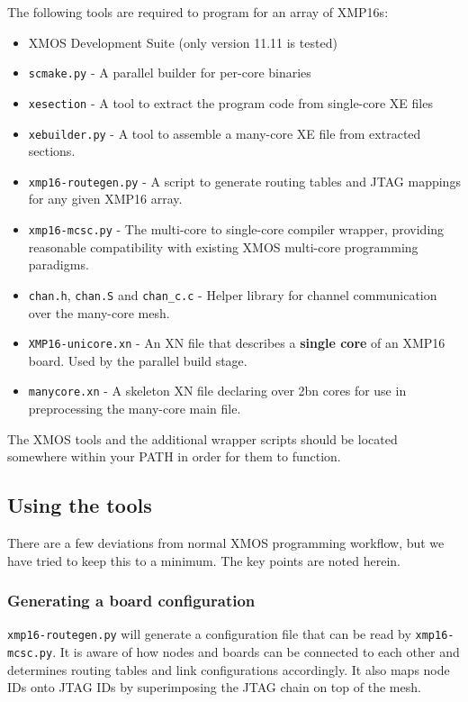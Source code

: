 \documentclass[12pt,a4paper,final,twoside]{article}
\begin{document}
The following tools are required to program for an array of XMP16s:

\begin{itemize}
\item XMOS Development Suite (only version 11.11 is tested)
\item \texttt{scmake.py} - A parallel builder for per-core binaries
\item \texttt{xesection} - A tool to extract the program code from single-core XE files
\item \texttt{xebuilder.py} - A tool to assemble a many-core XE file from extracted sections.
\item \texttt{xmp16-routegen.py} - A script to generate routing tables and JTAG mappings for any given XMP16 array.
\item \texttt{xmp16-mcsc.py} - The multi-core to single-core compiler wrapper, providing reasonable compatibility with existing XMOS multi-core programming paradigms.
\item \texttt{chan.h}, \texttt{chan.S} and \texttt{chan\_c.c} - Helper library for channel communication over the many-core mesh.
\item \texttt{XMP16-unicore.xn} - An XN file that describes a \textbf{single core} of an XMP16 board. Used by the parallel build stage.
\item \texttt{manycore.xn} - A skeleton XN file declaring over 2bn cores for use in preprocessing the many-core main file.
\end{itemize}

The XMOS tools and the additional wrapper scripts should be located somewhere within your PATH in order for them to function.

\subsection{Using the tools}

There are a few deviations from normal XMOS programming workflow, but we have tried to keep this to a minimum. The key points are noted herein.

\subsubsection{Generating a board configuration}

\texttt{xmp16-routegen.py} will generate a configuration file that can be read by \texttt{xmp16-mcsc.py}. It is aware of how nodes and boards can be connected to each other and determines routing tables and link configurations accordingly. It also maps node IDs onto JTAG IDs by superimposing the JTAG chain on top of the mesh.
\end{document}
